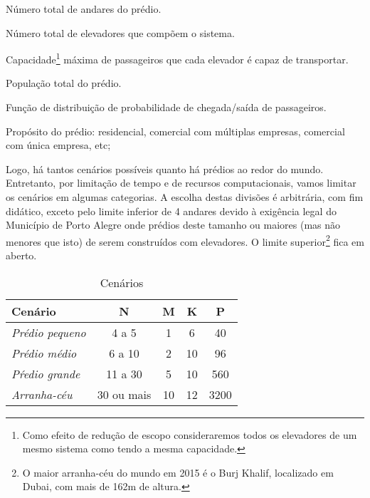 \begin{description}[leftmargin=!,labelwidth=\widthof{\bfseries Propósito}]
  \item[N]
  Número total de andares do prédio.
  \item[M]
  Número total de elevadores que compõem o sistema.
  \item[K]
  Capacidade\footnote{Como efeito de redução de escopo consideraremos todos os elevadores de um mesmo sistema como tendo a mesma capacidade.} máxima de passageiros que cada elevador é capaz de transportar.
  \item[P]
  População total do prédio.
  \item[F]
  Função de distribuição de probabilidade de chegada/saída de passageiros.
  \item[Propósito]
  Propósito do prédio: residencial, comercial com múltiplas empresas, comercial com única empresa, etc;
\end{description}

Logo, há tantos cenários possíveis quanto há prédios ao redor do mundo. Entretanto, por limitação de tempo e de recursos computacionais, vamos limitar os cenários em algumas categorias. A escolha destas divisões é arbitrária, com fim didático, exceto pelo limite inferior de 4 andares devido à exigência legal do Município de Porto Alegre onde prédios deste tamanho ou maiores (mas não menores que isto) de serem construídos com elevadores. O limite superior\footnote{O maior arranha-céu do mundo em 2015 é o Burj Khalif, localizado em Dubai, com mais de 162m de altura.} fica em aberto.


\begin{table}[htb!]
\centering
\caption{Cenários}
\label{table:tab1}
\begin{tabular}{|l|c|c|c|c|}
\hline
{\bf Cenário}        & {\bf N}    & {\bf M} & {\bf K} & {\bf P} \\ \hline
{\it Prédio pequeno} & 4 a 5      & 1       & 6       & 40      \\ \hline
{\it Prédio médio}   & 6 a 10     & 2       & 10      & 96      \\ \hline
{\it Pŕedio grande}  & 11 a 30    & 5       & 10      & 560     \\ \hline
{\it Arranha-céu}    & 30 ou mais & 10      & 12      & 3200    \\ \hline
\end{tabular}
\end{table}

